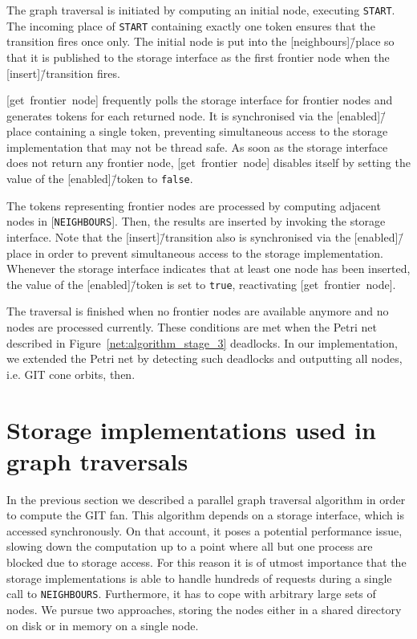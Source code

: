 The graph traversal is initiated by computing an initial node, executing \texttt{START}. The incoming place of \texttt{START} containing exactly one token ensures that the transition fires once only. The initial node is put into the [neighbours]\=/place so that it is published to the storage interface as the first frontier node when the [insert]\=/transition fires.

[get~frontier~node] frequently polls the storage interface for frontier nodes and generates tokens for each returned node. It is synchronised via the [enabled]\=/place containing a single token, preventing simultaneous access to the storage implementation that may not be thread safe. As soon as the storage interface does not return any frontier node, [get~frontier~node] disables itself by setting the value of the [enabled]\=/token to \texttt{false}.

The tokens representing frontier nodes are processed by computing adjacent nodes in [\texttt{NEIGHBOURS}]. Then, the results are inserted by invoking the storage interface. Note that the [insert]\=/transition also is synchronised via the [enabled]\=/place in order to prevent simultaneous access to the storage implementation. Whenever the storage interface indicates that at least one node has been inserted, the value of the [enabled]\=/token is set to \texttt{true}, reactivating [get~frontier~node].

The traversal is finished when no frontier nodes are available anymore and no nodes are processed currently. These conditions are met when the Petri net described in Figure~\ref{net:algorithm_stage_3} deadlocks. In our implementation, we extended the Petri net by detecting such deadlocks and outputting all nodes, i.e. GIT cone orbits, then.

\section{Storage implementations used in graph traversals}
\label{sec:storage_implementations}

In the previous section we described a parallel graph traversal algorithm in order to compute the GIT fan. This algorithm depends on a storage interface, which is accessed synchronously. On that account, it poses a potential performance issue, slowing down the computation up to a point where all but one process are blocked due to storage access. For this reason it is of utmost importance that the storage implementations is able to handle hundreds of requests during a single call to \texttt{NEIGHBOURS}. Furthermore, it has to cope with arbitrary large sets of nodes. We pursue two approaches, storing the nodes either in a shared directory on disk or in memory on a single node.

